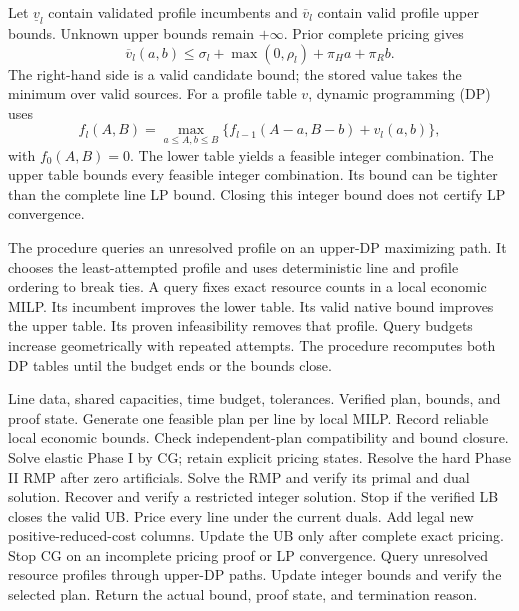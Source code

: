 Let $\underline v_l$ contain validated profile incumbents and $\overline v_l$ contain valid profile upper bounds. Unknown upper bounds remain $+\infty$. Prior complete pricing gives
\begin{equation}
\overline v_l(a,b)\leq\sigma_l+\max(0,\rho_l)+\pi_Ha+\pi_Rb.\label{eq:profilecut}
\end{equation}
The right-hand side is a valid candidate bound; the stored value takes the minimum over valid sources. For a profile table $v$, dynamic programming (DP) uses
\begin{equation}
f_l(A,B)=\max_{a\leq A,b\leq B}
\{f_{l-1}(A-a,B-b)+v_l(a,b)\},\label{eq:dp}
\end{equation}
with $f_0(A,B)=0$. The lower table yields a feasible integer combination. The upper table bounds every feasible integer combination. Its bound can be tighter than the complete line LP bound. Closing this integer bound does not certify LP convergence.

The procedure queries an unresolved profile on an upper-DP maximizing path. It chooses the least-attempted profile and uses deterministic line and profile ordering to break ties. A query fixes exact resource counts in a local economic MILP. Its incumbent improves the lower table. Its valid native bound improves the upper table. Its proven infeasibility removes that profile. Query budgets increase geometrically with repeated attempts. The procedure recomputes both DP tables until the budget ends or the bounds close.

\begin{algorithm}[!t]
\caption{Whole-Line CG With Integer Coordination}\label{alg:main}
\begin{algorithmic}[1]
\REQUIRE Line data, shared capacities, time budget, tolerances.
\ENSURE Verified plan, bounds, and proof state.
\STATE Generate one feasible plan per line by local MILP.
\STATE Record reliable local economic bounds.
\STATE Check independent-plan compatibility and bound closure.
\STATE Solve elastic Phase I by CG; retain explicit pricing states.
\STATE Resolve the hard Phase II RMP after zero artificials.
\STATE Solve the RMP and verify its primal and dual solution.
\STATE Recover and verify a restricted integer solution.
\STATE Stop if the verified LB closes the valid UB.
\STATE Price every line under the current duals.
\STATE Add legal new positive-reduced-cost columns.
\STATE Update the UB only after complete exact pricing.
\STATE Stop CG on an incomplete pricing proof or LP convergence.
\ENDWHILE
\STATE Query unresolved resource profiles through upper-DP paths.
\STATE Update integer bounds and verify the selected plan.
\STATE Return the actual bound, proof state, and termination reason.
\end{algorithmic}
\end{algorithm}

